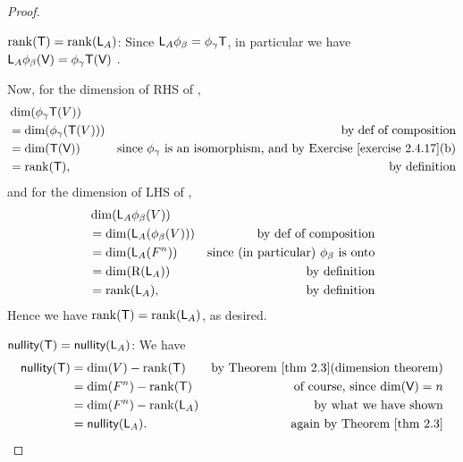 \begin{proof} \ 

\(\mathrm{rank}(\textsf{T}) = \mathrm{rank}(\textsf{L}_A)\):
Since \(\textsf{L}_A \phi_{\beta} = \phi_{\gamma} \textsf{T} \), in particular we have \(\textsf{L}_A \phi_{\beta}(\textsf{V}) = \phi_{\gamma} \textsf{T}(\textsf{V})\) .

Now, for the dimension of RHS of ,
\begin{align*}
    & \dim(\phi_{\gamma} \T(V)) \\
    & = \dim(\phi_{\gamma} (\T(V))) & \text{by def of composition} \\
    & = \dim(\T(\V)) & \text{since \(\phi_{\gamma}\) is an isomorphism, and by \EXEC{2.4.17}(b)} \\
    & = \rankT, & \text{by definition}
\end{align*}
and for the dimension of LHS of ,
\begin{align*}
    & \dim(\textsf{L}_A \phi_{\beta}(V)) \\
    & = \dim(\textsf{L}_A (\phi_{\beta}(V))) & \text{by def of composition} \\
    & = \dim(\textsf{L}_A (F^n)) & \text{since (in particular) \(\phi_{\beta}\) is onto} \\
    & = \dim(\mathrm{R}(\textsf{L}_A)) & \text{by definition} \\
    & = \mathrm{rank}(\textsf{L}_A), & \text{by definition}
\end{align*}
Hence we have \(\mathrm{rank}(\textsf{T}) = \mathrm{rank}(\textsf{L}_A)\), as desired.

\(\textsf{nullity}(\textsf{T}) = \textsf{nullity}(\textsf{L}_A)\):
We have
\begin{align*}
    \nullityT & = \dim(V) - \rankT & \text{by \THM{2.3}(dimension theorem)} \\
              & = \dim(F^n) - \rankT & \text{of course, since \(\dim(\V) = n\)} \\
              & = \dim(F^n) - \rank(\LMTRAN_A) & \text{by what we have shown} \\
              & = \nullity(\LMTRAN_A). & \text{again by \THM{2.3}}
\end{align*}
\end{proof}


